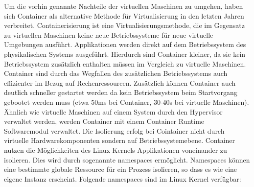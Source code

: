 Um die vorhin genannte Nachteile der virtuellen Maschinen zu umgehen, haben sich Container als alternative Methode für Virtualisierung in den letzten Jahren verbreitet. Containerisierung ist eine Virtualisierungsmethode, die im Gegensatz zu virtuellen Maschinen keine neue Betriebssysteme für neue virtuelle Umgebungen ausführt. Applikationen werden direkt auf dem Betriebssystem des physikalischen Systems ausgeführt.  Hierdurch sind Container kleiner, da sie kein Betriebssystem zusätzlich enthalten müssen im Vergleich zu virtuelle Maschinen. Container sind durch das Wegfallen des zusätzlichen Betriebssystems auch effizienter im Bezug auf Rechenressourcen. Zusätzlich können Container auch deutlich schneller gestartet werden da kein Betriebssystem beim Startvorgang gebootet werden muss (etwa 50ms bei Container, 30-40s bei virtuelle Maschinen). \cite{Martin2018} Ähnlich wie virtuelle Maschinen auf einem System durch den Hypervisor verwaltet werden, werden Container mit einem Container Runtime Softwaremodul verwaltet. Die Isolierung erfolg bei Cointainer nicht durch virtuelle Hardwarekomponenten sondern auf Betriebssystemebene. Container nutzen die Möglichkeiten des Linux Kernels Applikationen voneinander zu isolieren. Dies wird durch sogenannte namespaces ermöglicht. Namespaces können eine bestimmte globale Ressource für ein Prozess isolieren, so dass es wie eine eigene Instanz erscheint. Folgende namespaces sind im Linux Kernel verfügbar:
